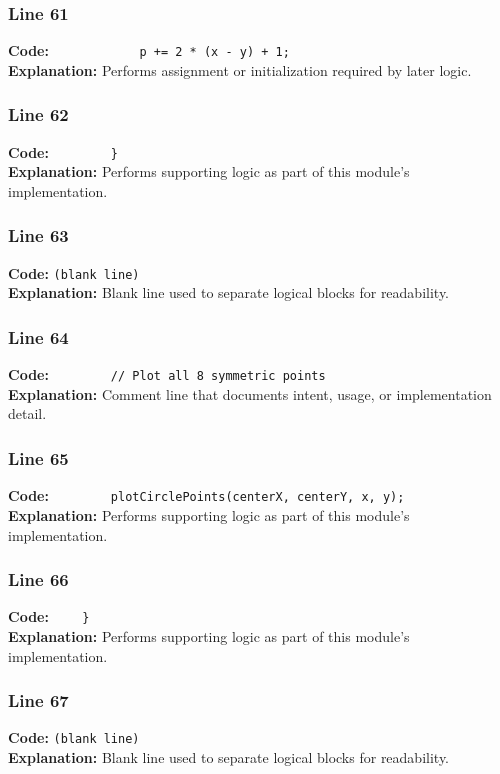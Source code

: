 \documentclass[11pt,a4paper]{article}
\begin{document}
\subsubsection*{Line 61}
\textbf{Code:} \verb|            p += 2 * (x - y) + 1;|\\
\textbf{Explanation:} Performs assignment or initialization required by later logic.

\subsubsection*{Line 62}
\textbf{Code:} \verb|        }|\\
\textbf{Explanation:} Performs supporting logic as part of this module's implementation.

\subsubsection*{Line 63}
\textbf{Code:} \texttt{(blank line)}\\
\textbf{Explanation:} Blank line used to separate logical blocks for readability.

\subsubsection*{Line 64}
\textbf{Code:} \verb|        // Plot all 8 symmetric points|\\
\textbf{Explanation:} Comment line that documents intent, usage, or implementation detail.

\subsubsection*{Line 65}
\textbf{Code:} \verb|        plotCirclePoints(centerX, centerY, x, y);|\\
\textbf{Explanation:} Performs supporting logic as part of this module's implementation.

\subsubsection*{Line 66}
\textbf{Code:} \verb|    }|\\
\textbf{Explanation:} Performs supporting logic as part of this module's implementation.

\subsubsection*{Line 67}
\textbf{Code:} \texttt{(blank line)}\\
\textbf{Explanation:} Blank line used to separate logical blocks for readability.
\end{document}
